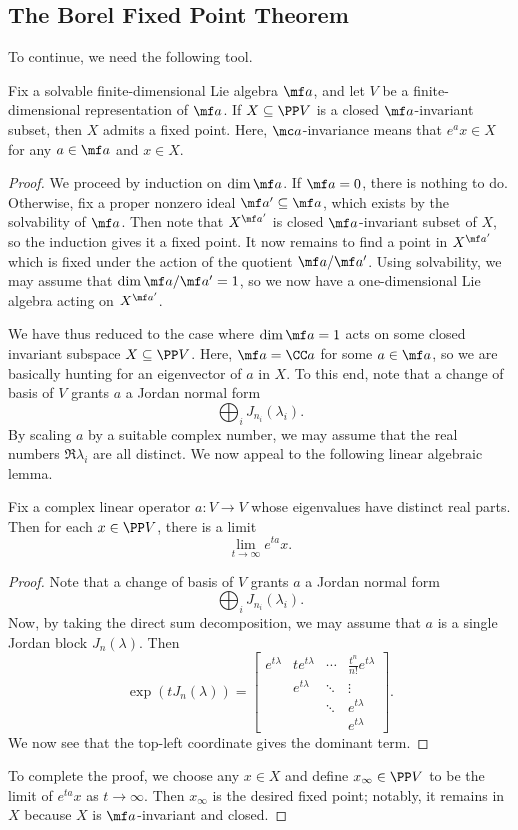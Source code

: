 \documentclass[../notes.tex]{subfiles}
\begin{document}
\subsection{The Borel Fixed Point Theorem}
To continue, we need the following tool.
\begin{theorem}
	Fix a solvable finite-dimensional Lie algebra $\mf a$, and let $V$ be a finite-dimensional representation of $\mf a$. If $X\subseteq\PP V$ is a closed $\mf a$-invariant subset, then $X$ admits a fixed point. Here, $\mc a$-invariance means that $e^ax\in X$ for any $a\in\mf a$ and $x\in X$.
\end{theorem}
\begin{proof}
	We proceed by induction on $\dim\mf a$. If $\mf a=0$, there is nothing to do. Otherwise, fix a proper nonzero ideal $\mf a'\subseteq\mf a$, which exists by the solvability of $\mf a$. Then note that $X^{\mf a'}$ is closed $\mf a$-invariant subset of $X$, so the induction gives it a fixed point. It now remains to find a point in $X^{\mf a'}$ which is fixed under the action of the quotient $\mf a/\mf a'$. Using solvability, we may assume that $\dim\mf a/\mf a'=1$, so we now have a one-dimensional Lie algebra acting on $X^{\mf a'}$.

	We have thus reduced to the case where $\dim\mf a=1$ acts on some closed invariant subspace $X\subseteq\PP V$. Here, $\mf a=\CC a$ for some $a\in\mf a$, so we are basically hunting for an eigenvector of $a$ in $X$. To this end, note that a change of basis of $V$ grants $a$ a Jordan normal form
	\[\bigoplus_iJ_{n_i}(\lambda_i).\]
	By scaling $a$ by a suitable complex number, we may assume that the real numbers $\Re\lambda_i$ are all distinct. We now appeal to the following linear algebraic lemma.
	\begin{lemma} \label{lem:limit-in-proj-space}
		Fix a complex linear operator $a\colon V\to V$ whose eigenvalues have distinct real parts. Then for each $x\in\PP V$, there is a limit
		\[\lim_{t\to\infty}e^{ta}x.\]
	\end{lemma}
	\begin{proof}
		Note that a change of basis of $V$ grants $a$ a Jordan normal form
		\[\bigoplus_iJ_{n_i}(\lambda_i).\]
		Now, by taking the direct sum decomposition, we may assume that $a$ is a single Jordan block $J_n(\lambda)$. Then
		\[\exp(tJ_n(\lambda))=\begin{bmatrix}
			e^{t\lambda} & te^{t\lambda} & \cdots & \frac{t^n}{n!}e^{t\lambda} \\
			& e^{t\lambda} & \ddots & \vdots \\
			&& \ddots & e^{t\lambda}\\
			&&& e^{t\lambda}
		\end{bmatrix}.\]
		We now see that the top-left coordinate gives the dominant term.
	\end{proof}
	To complete the proof, we choose any $x\in X$ and define $x_\infty\in\PP V$ to be the limit of $e^{ta}x$ as $t\to\infty$. Then $x_\infty$ is the desired fixed point; notably, it remains in $X$ because $X$ is $\mf a$-invariant and closed.
\end{proof}
\end{document}
